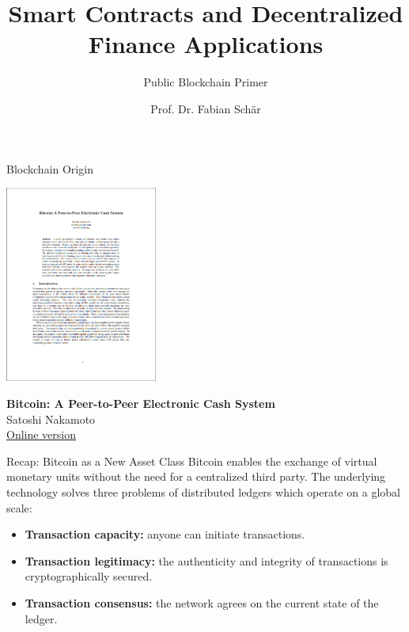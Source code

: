 \documentclass[]{beamer}
\title{Smart Contracts and Decentralized Finance Applications}
\subtitle{Public Blockchain Primer}
\author{Prof. Dr. Fabian Schär}
\institute{University of Basel}
\begin{document}
\thispagestyle{empty}
\begin{frame}[noframenumbering]
	\titlepage
\end{frame}

\begin{frame}{Blockchain Origin}

\centering
\includegraphics[width = 5cm, frame]{../assets/images/nakamoto_cover}
		
\textbf{Bitcoin: A Peer-to-Peer Electronic Cash System} \\ 
Satoshi Nakamoto \\
\href{https://bitcoin.org/bitcoin.pdf}{\link Online version}

\end{frame}

\begin{frame}{Recap: Bitcoin as a New Asset Class}
Bitcoin enables the exchange of virtual monetary units \textcolor{focus}{without the need for a centralized third party}. The underlying technology solves three problems of distributed ledgers which operate on a global scale:

\begin{itemize}
\item<2-> \textbf{Transaction capacity:} anyone can initiate transactions.
\item<3-> \textbf{Transaction legitimacy:} the authenticity and integrity of transactions is cryptographically secured.
\item<4-> \textbf{Transaction consensus:} the network agrees on the current state of the ledger.

\end{itemize}

\end{frame}
\end{document}
